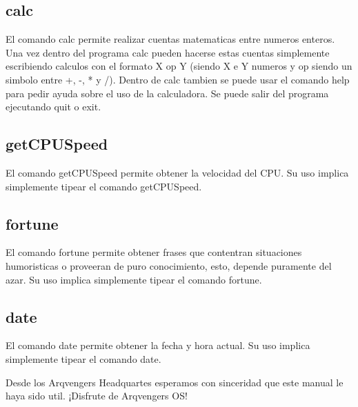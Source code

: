 \documentclass[a4paper,10pt]{article}
\begin{document}
    \subsection{calc}
        El comando calc permite realizar cuentas matematicas entre numeros enteros.
        Una vez dentro del programa calc pueden hacerse estas cuentas simplemente escribiendo calculos con el formato X op Y (siendo X e Y numeros y op siendo un simbolo entre +, -, * y /).
        Dentro de calc tambien se puede usar el comando help para pedir ayuda sobre el uso de la calculadora.
        Se puede salir del programa ejecutando quit o exit.
    \subsection{getCPUSpeed}
        El comando getCPUSpeed permite obtener la velocidad del CPU. Su uso implica simplemente tipear el comando getCPUSpeed.
    \subsection{fortune}
        El comando fortune permite obtener frases que contentran situaciones humoristicas o proveeran de puro conocimiento, esto, depende puramente del azar. Su uso implica simplemente tipear el comando fortune.
    \subsection{date}
        El comando date permite obtener la fecha y hora actual. Su uso implica simplemente tipear el comando date.
\vspace{2cm}

Desde los Arqvengers Headquartes esperamos con sinceridad que este manual le haya sido util. ¡Disfrute de Arqvengers OS!
\end{document}
